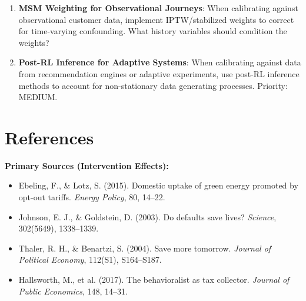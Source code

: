 \begin{enumerate}
\item \textbf{MSM Weighting for Observational Journeys}: When calibrating against
observational customer data, implement IPTW/stabilized weights to correct for
time-varying confounding. What history variables should condition the weights?

\item \textbf{Post-RL Inference for Adaptive Systems}: When calibrating against
data from recommendation engines or adaptive experiments, use post-RL inference
methods to account for non-stationary data generating processes. Priority: MEDIUM.
\end{enumerate}


\section{References}
\label{sec:iii-references}

\textbf{Primary Sources (Intervention Effects):}
\begin{itemize}[nosep]
\item Ebeling, F., \& Lotz, S. (2015). Domestic uptake of green energy promoted by opt-out tariffs. \emph{Energy Policy}, 80, 14--22.
\item Johnson, E. J., \& Goldstein, D. (2003). Do defaults save lives? \emph{Science}, 302(5649), 1338--1339.
\item Thaler, R. H., \& Benartzi, S. (2004). Save more tomorrow. \emph{Journal of Political Economy}, 112(S1), S164--S187.
\item Hallsworth, M., et al. (2017). The behavioralist as tax collector. \emph{Journal of Public Economics}, 148, 14--31.
\end{itemize}

